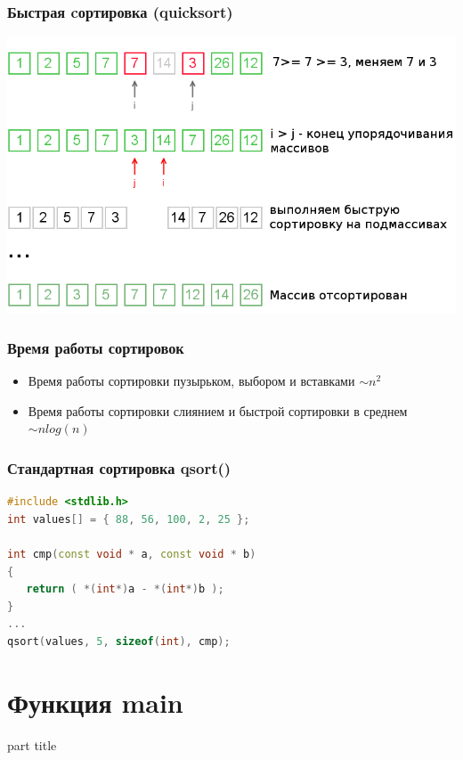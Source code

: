\documentclass[14pt,pdf,hyperref={unicode}]{beamer}
\begin{document}
\begin{frame}[fragile]
\frametitle{Быстрая cортировка (quicksort)} 
\begin{center}
\includegraphics[width=0.9\linewidth]{images/qs2.png}
\end{center}
\end{frame}


\begin{frame}[fragile]
\frametitle{Время работы сортировок} 
\begin{itemize}
\item Время работы сортировки пузырьком, выбором и вставками $\sim n^2$ \\
\item Время работы сортировки слиянием и быстрой сортировки в среднем $\sim n log(n)$ \\
\end{itemize}
\end{frame}



\begin{frame}[fragile]
\frametitle{Стандартная сортировка qsort()} 
\begin{lstlisting}[language=C++,basicstyle=\ttfamily,keywordstyle=\color{blue}]
#include <stdlib.h>
int values[] = { 88, 56, 100, 2, 25 };

int cmp(const void * a, const void * b)
{
   return ( *(int*)a - *(int*)b );
}
...
qsort(values, 5, sizeof(int), cmp);

\end{lstlisting}
\end{frame}












\section{Функция main}
\begin{frame}
\begin{center}
\begin{beamercolorbox}[sep=8pt,center]{part
title}
\insertsection
\end{beamercolorbox}
\end{center}
\end{frame}
\end{document}
